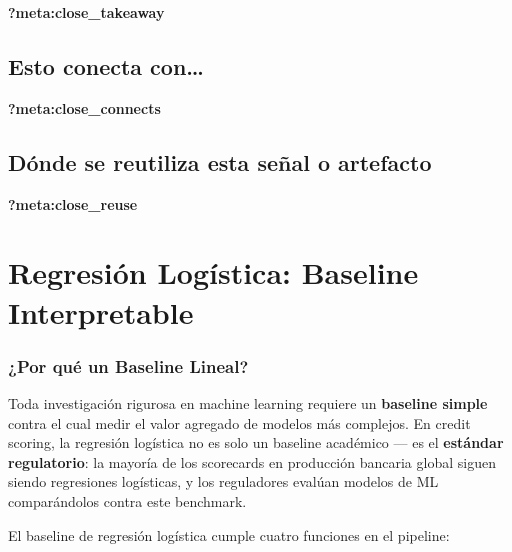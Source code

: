 \documentclass[
  spanish,
  11pt,
  letterpaper,
]{scrbook}
\theoremstyle{plain}
\theoremstyle{remark}
\begin{document}
\begin{tcolorbox}[enhanced jigsaw, arc=.35mm, bottomrule=.15mm, bottomtitle=1mm, breakable, colback=white, colbacktitle=quarto-callout-tip-color!10!white, colframe=quarto-callout-tip-color-frame, coltitle=black, left=2mm, leftrule=.75mm, opacityback=0, opacitybacktitle=0.6, rightrule=.15mm, title=\textcolor{quarto-callout-tip-color}{\faLightbulb}\hspace{0.5em}{Qué debes quedarte}, titlerule=0mm, toprule=.15mm, toptitle=1mm]

\textbf{?meta:close\_takeaway}

\section{Esto conecta con\ldots{}}\label{esto-conecta-con-4}

\textbf{?meta:close\_connects}

\section{Dónde se reutiliza esta señal o
artefacto}\label{duxf3nde-se-reutiliza-esta-seuxf1al-o-artefacto-4}

\textbf{?meta:close\_reuse}

\end{tcolorbox}

\chapter{Regresión Logística: Baseline
Interpretable}\label{sec-lr-baseline}

\subsection{¿Por qué un Baseline
Lineal?}\label{por-quuxe9-un-baseline-lineal}

Toda investigación rigurosa en machine learning requiere un
\textbf{baseline simple} contra el cual medir el valor agregado de
modelos más complejos. En credit scoring, la regresión logística no es
solo un baseline académico --- es el \textbf{estándar regulatorio}: la
mayoría de los scorecards en producción bancaria global siguen siendo
regresiones logísticas, y los reguladores evalúan modelos de ML
comparándolos contra este benchmark.

El baseline de regresión logística cumple cuatro funciones en el
pipeline:
\end{document}
